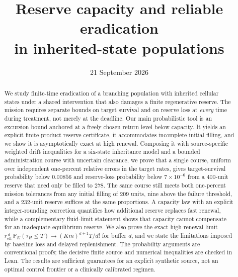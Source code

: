 \documentclass[11pt]{article}
\title{Reserve capacity and reliable eradication\protect\\in inherited-state populations}
\author{}
\date{21 September 2026}
\theoremstyle{remark}\newtheorem{remark}[theorem]{Remark}
\newcommand{\Prob}{\mathbb P}
\newcommand{\1}{\mathbf 1}
\newcommand{\reff}{r_{\mathrm{eff}}}
\begin{document}
\maketitle

\begin{abstract}
We study finite-time eradication of a branching population with inherited cellular states under a shared intervention that also damages a finite regenerative reserve. The mission requires separate bounds on target survival and on reserve loss at \emph{every} time during treatment, not merely at the deadline. Our main probabilistic tool is an excursion bound anchored at a freely chosen return level below capacity. It yields an explicit finite-product reserve certificate, it accommodates incomplete initial filling, and we show it is asymptotically exact at high renewal. Composing it with source-specific weighted drift inequalities for a six-state inheritance model and a bounded administration course with uncertain clearance, we prove that a single course, uniform over independent one-percent relative errors in the target rates, gives target-survival probability below $0.00856$ and reserve-loss probability below $7\times10^{-6}$ from a $400$-unit reserve that need only be filled to $278$. The same course still meets both one-percent mission tolerances from any initial filling of $209$ units, nine above the failure threshold, and a $232$-unit reserve suffices at the same proportions. A capacity law with an explicit integer-rounding correction quantifies how additional reserve replaces fast renewal, while a complementary fluid-limit statement shows that capacity cannot compensate for an inadequate equilibrium reserve. We also prove the exact high-renewal limit $\reff^{\,d}\,\Prob_K(\tau_H\le T)\to(Km)^{d+1}T/d!$ for buffer $d$, and we state the limitations imposed by baseline loss and delayed replenishment. The probability arguments are conventional proofs; the decisive finite source and numerical inequalities are checked in Lean. The results are sufficient guarantees for an explicit synthetic source, not an optimal control frontier or a clinically calibrated regimen.
\end{abstract}
\end{document}
